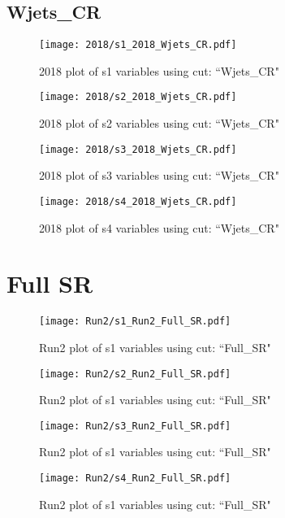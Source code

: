 \documentclass{article}
\begin{document}
      \subsection*{Wjets\_CR}
                        \begin{figure}[H]
                            \centering
                            \caption{2018 plot of s1 variables using cut: ``Wjets\_CR"}
                            \texttt{[image: 2018/s1\_2018\_Wjets\_CR.pdf]}
                        \end{figure}    
                        \begin{figure}[H]
                            \centering
                            \caption{2018 plot of s2 variables using cut: ``Wjets\_CR"}
                            \texttt{[image: 2018/s2\_2018\_Wjets\_CR.pdf]}
                        \end{figure}    
                        \begin{figure}[H]
                            \centering
                            \caption{2018 plot of s3 variables using cut: ``Wjets\_CR"}
                            \texttt{[image: 2018/s3\_2018\_Wjets\_CR.pdf]}
                        \end{figure}    
                        \begin{figure}[H]
                            \centering
                            \caption{2018 plot of s4 variables using cut: ``Wjets\_CR"}
                            \texttt{[image: 2018/s4\_2018\_Wjets\_CR.pdf]}
                        \end{figure}    
    \section*{Full SR}
        \begin{figure}[H]
            \centering
            \caption{Run2 plot of s1 variables using cut: ``Full\_SR"}
            \texttt{[image: Run2/s1\_Run2\_Full\_SR.pdf]}
        \end{figure}
        \begin{figure}[H]
            \centering
            \caption{Run2 plot of s1 variables using cut: ``Full\_SR"}
            \texttt{[image: Run2/s2\_Run2\_Full\_SR.pdf]}
        \end{figure}  
        \begin{figure}[H]
            \centering
            \caption{Run2 plot of s1 variables using cut: ``Full\_SR"}
            \texttt{[image: Run2/s3\_Run2\_Full\_SR.pdf]}
        \end{figure}  
        \begin{figure}[H]
            \centering
            \caption{Run2 plot of s1 variables using cut: ``Full\_SR"}
            \texttt{[image: Run2/s4\_Run2\_Full\_SR.pdf]}
        \end{figure}  
\end{document}

